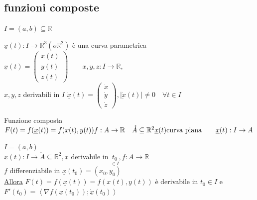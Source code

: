 \documentclass[a4paper, oneside]{article}
\begin{document}
    \subsection{funzioni composte}
        $I=(a,b) \subseteq \mathbb{R}$
        \begin{definition}
            $\underline{x}(t):I \to \mathbb{R}^3(o \mathbb{R}^2)$ è una curva parametrica\\
             $\underline{x}(t) = \begin{pmatrix} x(t) \\ y(t) \\ z(t) \end{pmatrix} \qquad x,y,z:I \to \mathbb{R}$,\\
            $x,y,z$ derivabili in $I$ $ \dot{\underline{x}}(t) = \begin{pmatrix} \dot{x} \\ \dot{y} \\ \dot{z} \end{pmatrix}, |\dot{\underbar{x}}(t)| \neq 0 \quad \forall t \in I $
        \end{definition}
        \begin{definition}
            Funzione composta\\
            $F(t) = f(\underline{x}(t)) = f(x(t),y(t))\\
            f:A \to \mathbb{R} \quad \mathring{A} \subseteq \mathbb{R}^2\\
            \underline{x}(t) \text{curva piana} \qquad \underline{x}(t):I \to A$
        \end{definition}
        \begin{theorem}
            $I=(a,b)$\\
            $\underline{x}(t):I \to \mathring{A} \subseteq \mathbb{R}^2, \underline{x}$ derivabile in $\underset{\in I}{t_0},f:A \to \mathbb{R}$\\
            $f$ differenziabile in $\underline{x}(t_0) = (x_0,y_0)$\\
            \underline{Allora} $F(t) = f(\underline{x}(t)) = f(x(t),y(t))$ è derivabile in $t_0 \in I$ e $F'(t_0) = \left\langle \nabla f(\underline{x}(t_0));\underline{\dot{x}}(t_0)\right\rangle $
        \end{theorem}
\end{document}

